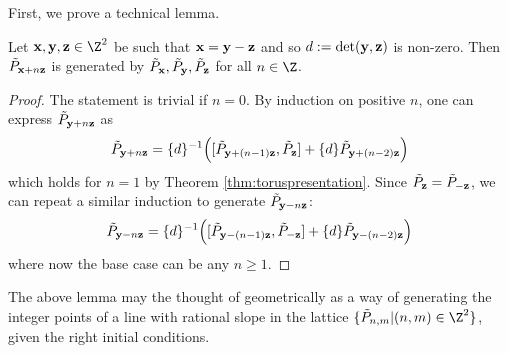 First, we prove a technical lemma. 
\begin{lemma} \label{lem:generateline}
Let $\xx, \yy, \zz \in \Z^2$ be  such that ${\mathbf{x}} = {\mathbf{y}}-{\mathbf{z}}$ and so $d := \det({\mathbf{y}},{\mathbf{z}})$ is non-zero. Then $\tilde{P}_{{\mathbf{x}}+n{\mathbf{z}}}$ is generated by $\tilde{P}_{\mathbf{x}}, \tilde{P}_{\mathbf{y}}, \tilde{P}_{\mathbf{z}}$ for all $n \in \Z$. 
\end{lemma}
\begin{proof}
The statement is trivial if $n=0$. By induction on positive $n$, one can express $\tilde{P}_{{\mathbf{y}}+n{\mathbf{z}}}$ as
\[
    \tilde{P}_{{\mathbf{y}}+n{\mathbf{z}}} = \{ d \}^{-1} \Big( [\tilde{P}_{{\mathbf{y}}+ (n-1){\mathbf{z}}}, \tilde{P}_{\mathbf{z}}] + \{ d \} \tilde{P}_{{\mathbf{y}}+(n-2){\mathbf{z}}} \Big)
\]
which holds for $n=1$ by Theorem \ref{thm:toruspresentation}. Since $\tilde{P}_{\mathbf{z}} = \tilde{P}_{-{\mathbf{z}}}$, we can repeat a similar induction to generate $\tilde{P}_{{\mathbf{y}} -n{\mathbf{z}}}$:
\[
    \tilde{P}_{{\mathbf{y}}-n{\mathbf{z}}} = \{ d \}^{-1} \Big( [ \tilde{P}_{{\mathbf{y}}-(n-1){\mathbf{z}}}, \tilde{P}_{-{\mathbf{z}}} ] + \{ d \} \tilde{P}_{{\mathbf{y}}-(n-2){\mathbf{z}}} \Big)
\]
where now the base case can be any $n \geq 1$. 
\end{proof}
The above lemma may the thought of geometrically as a way of generating the integer points of a line with rational slope in the lattice $\{ \tilde{P}_{n,m} \vert (n,m) \in \Z^2 \}$, given the right initial conditions.


